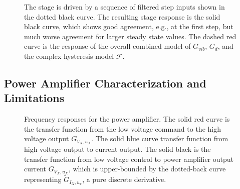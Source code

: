 \documentclass[journal,twocolumn,twoside]{IEEEtran}
\begin{document}
\begin{figure}
  
  \caption{The stage is driven by a sequence of filtered step inputs shown in the dotted black curve. The resulting stage response is the solid black curve, which shows good agreement, e.g., at the first step, but much worse agreement for larger steady state values. The dashed red curve is the response of the overall combined model of $G_{vib}$, $G_{d}$, and the complex hysteresis model $\mathcal{F}$.}
  \label{fig:hyst_resp_dem}
\end{figure}


\subsection{Power Amplifier Characterization and Limitations}\label{sec:powcharct}
\begin{figure}[htbp]
\centering

\caption{
  Frequency responses for the power amplifier. The solid red curve is the transfer function from the low voltage command to the high voltage output $G_{V_X, u_X}$. The solid blue curve transfer function from high voltage output to current output. The solid black is the transfer function from low voltage control to power amplifier output current $G_{V_X, u_X}$, which is upper-bounded by the dotted-back curve representing $\tilde G_{I_X, u_x}$, a pure discrete derivative.}
\label{fig:powTF}
\end{figure}
\end{document}
